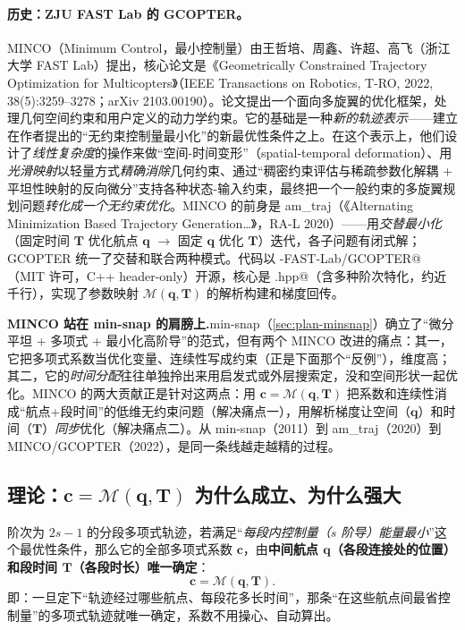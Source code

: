 \paragraph{历史：ZJU FAST Lab 的 GCOPTER。}
MINCO（Minimum Control，最小控制量）由王哲培、周鑫、许超、高飞（浙江大学 FAST Lab）提出，核心论文是《Geometrically Constrained Trajectory Optimization for Multicopters》（IEEE Transactions on Robotics, T-RO, 2022, 38(5):3259--3278；arXiv 2103.00190）\cite{wang2022minco}。论文提出一个面向多旋翼的优化框架，处理几何空间约束和用户定义的动力学约束。它的基础是一种\emph{新的轨迹表示}——建立在作者提出的“无约束控制量最小化”的新最优性条件之上。在这个表示上，他们设计了\emph{线性复杂度}的操作来做“空间-时间变形”（spatial-temporal deformation）、用\emph{光滑映射}以轻量方式\emph{精确消除}几何约束、通过“稠密约束评估与稀疏参数化解耦 + 平坦性映射的反向微分”支持各种状态-输入约束，最终把一个一般约束的多旋翼规划问题\emph{转化成一个无约束优化}。MINCO 的前身是 am\_traj（《Alternating Minimization Based Trajectory Generation\dots》，RA-L 2020）——用\emph{交替最小化}（固定时间 $\mathbf T$ 优化航点 $\mathbf q$ $\to$ 固定 $\mathbf q$ 优化 $\mathbf T$）迭代，各子问题有闭式解\cite{wang2020amtraj}；GCOPTER 统一了交替和联合两种模式。代码以 \verb@ZJU-FAST-Lab/GCOPTER@（MIT 许可，C++ header-only）开源，核心是 \verb@minco.hpp@（含多种阶次特化，约近千行），实现了参数映射 $\mathcal M(\mathbf q,\mathbf T)$ 的解析构建和梯度回传。

\begin{note}
\textbf{MINCO 站在 min-snap 的肩膀上.}\;min-snap（\cref{sec:plan-minsnap}）确立了“微分平坦 + 多项式 + 最小化高阶导”的范式，但有两个 MINCO 改进的痛点：其一，它把多项式系数当优化变量、连续性写成约束（正是下面那个“反例”），维度高；其二，它的\emph{时间分配}往往单独拎出来用启发式或外层搜索定，没和空间形状一起优化。MINCO 的两大贡献正是针对这两点：用 $\mathbf c=\mathcal M(\mathbf q,\mathbf T)$ 把系数和连续性消成“航点+段时间”的低维无约束问题（解决痛点一），用解析梯度让空间（$\mathbf q$）和时间（$\mathbf T$）\emph{同步}优化（解决痛点二）。从 min-snap（2011）到 am\_traj（2020）到 MINCO/GCOPTER（2022），是同一条线越走越精的过程。
\end{note}

\subsection{理论：\texorpdfstring{$\mathbf c=\mathcal M(\mathbf q,\mathbf T)$}{c=M(q,T)} 为什么成立、为什么强大}
\label{sec:st-minco-theory}

\begin{theorem}\label{thm:st-minco-map}
阶次为 $2s-1$ 的分段多项式轨迹，若满足“\emph{每段内控制量（$s$ 阶导）能量最小}”这个最优性条件，那么它的全部多项式系数 $\mathbf c$，由\textbf{中间航点 $\mathbf q$（各段连接处的位置）和段时间 $\mathbf T$（各段时长）唯一确定}：
\begin{equation}
  \mathbf c=\mathcal M(\mathbf q,\mathbf T).
  \label{eq:st-minco-map}
\end{equation}
即：一旦定下“轨迹经过哪些航点、每段花多长时间”，那条“在这些航点间最省控制量”的多项式轨迹就唯一确定，系数不用操心、自动算出。
\end{theorem}

